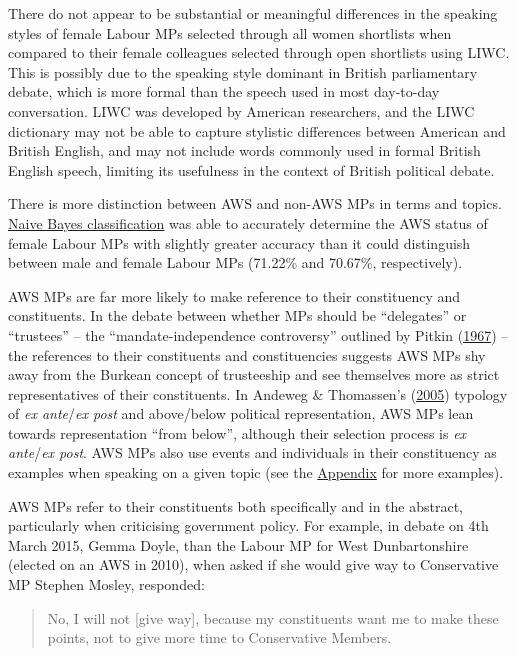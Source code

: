 \documentclass[]{article}
\theoremstyle{definition}
\theoremstyle{definition}
\theoremstyle{definition}
\theoremstyle{remark}
\begin{document}
\begin{table}[H]
\begin{table}[H]
\begin{table}[H]
\begin{table}[H]
\begin{table}[H]
\begin{table}[H]
\begin{table}[H]
\begin{table}[H]
There do not appear to be substantial or meaningful differences in the
speaking styles of female Labour MPs selected through all women
shortlists when compared to their female colleagues selected through
open shortlists using LIWC. This is possibly due to the speaking style
dominant in British parliamentary debate, which is more formal than the
speech used in most day-to-day conversation. LIWC was developed by
American researchers, and the LIWC dictionary may not be able to capture
stylistic differences between American and British English, and may not
include words commonly used in formal British English speech, limiting
its usefulness in the context of British political debate.

There is more distinction between AWS and non-AWS MPs in terms and
topics.
\protect\hyperlink{ux5cux2520Naiveux5cux2520Bayesux5cux2520classification}{Naive
Bayes classification} was able to accurately determine the AWS status of
female Labour MPs with slightly greater accuracy than it could
distinguish between male and female Labour MPs (71.22\% and 70.67\%,
respectively).

AWS MPs are far more likely to make reference to their constituency and
constituents. In the debate between whether MPs should be ``delegates''
or ``trustees'' -- the ``mandate-independence controversy'' outlined by
Pitkin (\protect\hyperlink{ref-pitkin1967}{1967}) -- the references to
their constituents and constituencies suggests AWS MPs shy away from the
Burkean concept of trusteeship and see themselves more as strict
representatives of their constituents. In Andeweg \& Thomassen's
(\protect\hyperlink{ref-andeweg2005}{2005}) typology of \emph{ex
ante}/\emph{ex post} and above/below political representation, AWS MPs
lean towards representation ``from below'', although their selection
process is \emph{ex ante}/\emph{ex post}. AWS MPs also use events and
individuals in their constituency as examples when speaking on a given
topic (see the
\protect\hyperlink{ux5cux2520AWSux5cux2520Referencesux5cux2520toux5cux2520Constituentsux5cux2520inux5cux2520Context}{Appendix}
for more examples).

AWS MPs refer to their constituents both specifically and in the
abstract, particularly when criticising government policy. For example,
in debate on 4th March 2015, Gemma Doyle, than the Labour MP for West
Dunbartonshire (elected on an AWS in 2010), when asked if she would give
way to Conservative MP Stephen Mosley, responded:

\begin{quote}
No, I will not {[}give way{]}, because my constituents want me to make
these points, not to give more time to Conservative Members.
\end{quote}


\end{table}
\end{table}
\end{table}
\end{table}
\end{table}
\end{table}
\end{table}
\end{table}
\end{document}
